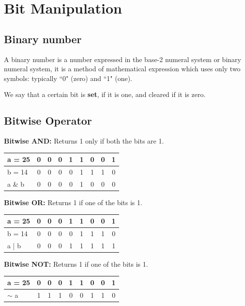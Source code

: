 \chapter{Bit Manipulation}

\section{Binary number}
A binary number is a number expressed in the base-2 numeral system or binary numeral system, it is a method of mathematical expression which uses only two symbols: typically ``0" (zero) and ``1" (one).

We say that a certain bit is \textbf{set}, if it is one, and cleared if it is zero.

\section{Bitwise Operator}

\vspace{3ex}
\textbf{\large{Bitwise AND}: }
Returns 1 only if both the bits are 1.

\begin{tabularx}{9cm}{|P{1cm}|C|C|C|C|C|C|C|C|}\hline
   a = 25 &
   0 & 0 & 0 & 1 & 1 & 0 & 0 & 1\\\hline
   b = 14 &
   0 & 0 & 0 & 0 & 1 & 1 & 1 & 0\\\hline
   a \& b &
   0 & 0 & 0 & 0 & 1 & 0 & 0 & 0\\\hline
\end{tabularx}

\vspace{3ex}
\textbf{\large{Bitwise OR}: }
Returns 1 if one of the bits is 1.

\begin{tabularx}{9cm}{|P{1.5cm}|C|C|C|C|C|C|C|C|}\hline
   a = 25 &
   0 & 0 & 0 & 1 & 1 & 0 & 0 & 1\\\hline
   b = 14 &
   0 & 0 & 0 & 0 & 1 & 1 & 1 & 0\\\hline
   a | b &
   0 & 0 & 0 & 1 & 1 & 1 & 1 & 1\\\hline
\end{tabularx}

\vspace{3ex}
\textbf{\large{Bitwise NOT}: }
Returns 1 if one of the bits is 1.

\begin{tabularx}{9cm}{|P{1.5cm}|C|C|C|C|C|C|C|C|}\hline
   a = 25 &
   0 & 0 & 0 & 1 & 1 & 0 & 0 & 1\\\hline
   $\sim$ a &
   1 & 1 & 1 & 0 & 0 & 1 & 1 & 0\\\hline
\end{tabularx}

